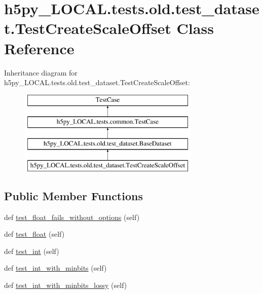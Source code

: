 \hypertarget{classh5py__LOCAL_1_1tests_1_1old_1_1test__dataset_1_1TestCreateScaleOffset}{}\section{h5py\+\_\+\+L\+O\+C\+A\+L.\+tests.\+old.\+test\+\_\+dataset.\+Test\+Create\+Scale\+Offset Class Reference}
\label{classh5py__LOCAL_1_1tests_1_1old_1_1test__dataset_1_1TestCreateScaleOffset}
Inheritance diagram for h5py\+\_\+\+L\+O\+C\+A\+L.\+tests.\+old.\+test\+\_\+dataset.\+Test\+Create\+Scale\+Offset\+:\begin{figure}[H]
\begin{center}
\leavevmode
\includegraphics[height=4.000000cm]{classh5py__LOCAL_1_1tests_1_1old_1_1test__dataset_1_1TestCreateScaleOffset}
\end{center}
\end{figure}
\subsection*{Public Member Functions}
\begin{DoxyCompactItemize}
\item 
def \hyperlink{classh5py__LOCAL_1_1tests_1_1old_1_1test__dataset_1_1TestCreateScaleOffset_ae0de4563b04d321223c9e3247b0f4642}{test\+\_\+float\+\_\+fails\+\_\+without\+\_\+options} (self)
\item 
def \hyperlink{classh5py__LOCAL_1_1tests_1_1old_1_1test__dataset_1_1TestCreateScaleOffset_aabd50306361ab1a17ad77f71c427dbce}{test\+\_\+float} (self)
\item 
def \hyperlink{classh5py__LOCAL_1_1tests_1_1old_1_1test__dataset_1_1TestCreateScaleOffset_a03372eb6e07add3a78332080b7c98bdf}{test\+\_\+int} (self)
\item 
def \hyperlink{classh5py__LOCAL_1_1tests_1_1old_1_1test__dataset_1_1TestCreateScaleOffset_a76684114349a7dbdbabae07c7aca547a}{test\+\_\+int\+\_\+with\+\_\+minbits} (self)
\item 
def \hyperlink{classh5py__LOCAL_1_1tests_1_1old_1_1test__dataset_1_1TestCreateScaleOffset_ad30b71b8989d34d2c4c2359d8e12918c}{test\+\_\+int\+\_\+with\+\_\+minbits\+\_\+lossy} (self)
\end{DoxyCompactItemize}
